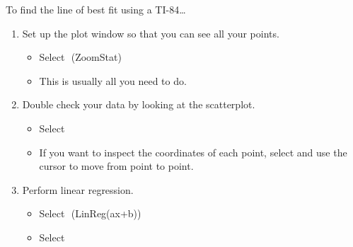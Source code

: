 \begin{myConcept}{To find the line of best fit using a {\scshape TI-84}\dots}
\begin{enumerate}[]
\begin{itemize}
                \item Put $x$ data into the $L_1$ column and $y$ data into the $L_2$ column.
                \item Use the cursor keys to switch columns.
                \item To clear a column, move to the column header and select 
            \end{itemize}
        \item Set up the plot window so that you can see all your points.
            \begin{itemize}
                \item Select 
                    \,\,{\footnotesize\ttfamily (ZoomStat)}
                \item This is usually all you need to do.
            \end{itemize}
        \item Double check your data by looking at the scatterplot.
            \begin{itemize}
                \item Select 
                \item If you want to inspect the coordinates of each point, 
                    select 
                     and use the cursor to move from point to point.
            \end{itemize}
        \item Perform linear regression.
            \begin{itemize}
                \item Select 
                    \,\,{(\small\ttfamily LinReg(ax+b))}
                \item Select 
            \end{itemize}
    \end{enumerate}
\end{myConcept}


